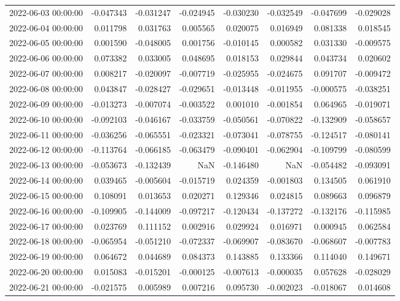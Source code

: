 \begin{tabular}{lrrrrrrr}
2022-06-03 00:00:00 & -0.047343 & -0.031247 & -0.024945 & -0.030230 & -0.032549 & -0.047699 & -0.029028 \\
2022-06-04 00:00:00 & 0.011798 & 0.031763 & 0.005565 & 0.020075 & 0.016949 & 0.081338 & 0.018545 \\
2022-06-05 00:00:00 & 0.001590 & -0.048005 & 0.001756 & -0.010145 & 0.000582 & 0.031330 & -0.009575 \\
2022-06-06 00:00:00 & 0.073382 & 0.033005 & 0.048695 & 0.018153 & 0.029844 & 0.043734 & 0.020602 \\
2022-06-07 00:00:00 & 0.008217 & -0.020097 & -0.007719 & -0.025955 & -0.024675 & 0.091707 & -0.009472 \\
2022-06-08 00:00:00 & 0.043847 & -0.028427 & -0.029651 & -0.013448 & -0.011955 & -0.000575 & -0.038251 \\
2022-06-09 00:00:00 & -0.013273 & -0.007074 & -0.003522 & 0.001010 & -0.001854 & 0.064965 & -0.019071 \\
2022-06-10 00:00:00 & -0.092103 & -0.046167 & -0.033759 & -0.050561 & -0.070822 & -0.132909 & -0.058657 \\
2022-06-11 00:00:00 & -0.036256 & -0.065551 & -0.023321 & -0.073041 & -0.078755 & -0.124517 & -0.080141 \\
2022-06-12 00:00:00 & -0.113764 & -0.066185 & -0.063479 & -0.090401 & -0.062904 & -0.109799 & -0.080599 \\
2022-06-13 00:00:00 & -0.053673 & -0.132439 & NaN & -0.146480 & NaN & -0.054482 & -0.093091 \\
2022-06-14 00:00:00 & 0.039465 & -0.005604 & -0.015719 & 0.024359 & -0.001803 & 0.134505 & 0.061910 \\
2022-06-15 00:00:00 & 0.108091 & 0.013653 & 0.020271 & 0.129346 & 0.024815 & 0.089663 & 0.096879 \\
2022-06-16 00:00:00 & -0.109905 & -0.144009 & -0.097217 & -0.120434 & -0.137272 & -0.132176 & -0.115985 \\
2022-06-17 00:00:00 & 0.023769 & 0.111152 & 0.002916 & 0.029924 & 0.016971 & 0.000945 & 0.062584 \\
2022-06-18 00:00:00 & -0.065954 & -0.051210 & -0.072337 & -0.069907 & -0.083670 & -0.068607 & -0.007783 \\
2022-06-19 00:00:00 & 0.064672 & 0.044689 & 0.084373 & 0.143885 & 0.133366 & 0.114040 & 0.149671 \\
2022-06-20 00:00:00 & 0.015083 & -0.015201 & -0.000125 & -0.007613 & -0.000035 & 0.057628 & -0.028029 \\
2022-06-21 00:00:00 & -0.021575 & 0.005989 & 0.007216 & 0.095730 & -0.002023 & -0.018067 & 0.014608 \\

\end{tabular}
